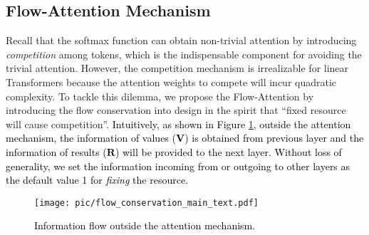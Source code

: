 \documentclass[nohyperref]{article}
\theoremstyle{plain}
\theoremstyle{definition}
\theoremstyle{remark}
\newcommand{\update}[1]{{\textcolor{black}{#1}}}
\begin{document}
\subsection{Flow-Attention Mechanism}

Recall that the softmax function can obtain non-trivial attention by introducing \emph{competition} among tokens, which is the indispensable component for avoiding the trivial attention. However, the competition mechanism is irrealizable for linear Transformers because the attention weights to compete will incur quadratic complexity. To tackle this dilemma, we propose the Flow-Attention by introducing the flow conservation into design in the spirit that ``fixed resource will cause competition''. \update{Intuitively, as shown in Figure \ref{fig:flow_conservation}, outside the attention mechanism, the information of values ($\mathbf{V}$) is obtained from previous layer and the information of results ($\mathbf{R}$) will be provided to the next layer. Without loss of generality, we set the information incoming from or outgoing to other layers as the default value 1 for \emph{fixing} the resource.}

\begin{figure}[ht]
    \begin{center}
    \centerline{\texttt{[image: pic/flow\_conservation\_main\_text.pdf]}}
    \vspace{-5pt}
    \caption{\update{Information flow outside the attention mechanism.}}
    \label{fig:flow_conservation}
    \vspace{-10pt}
    \end{center}
\end{figure}
\end{document}
